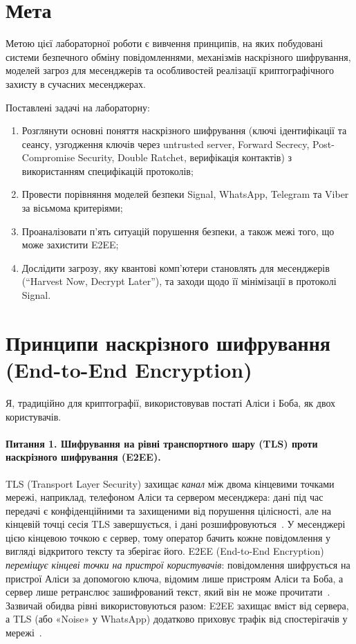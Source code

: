 \section{Мета}
\label{sec:objective}
Метою цієї лабораторної роботи є вивчення принципів, на яких побудовані системи безпечного обміну повідомленнями, 
механізмів наскрізного шифрування, моделей загроз для месенджерів та особливостей реалізації криптографічного 
захисту в сучасних месенджерах.

Поставлені задачі на лабораторну:
\begin{enumerate}[noitemsep]
    \item Розглянути основні поняття наскрізного шифрування (ключі ідентифікації та сеансу, узгодження ключів через 
        untrusted server, Forward Secrecy, Post-Compromise Security, Double Ratchet, верифікація контактів) з 
        використанням специфікацій протоколів;
    \item Провести порівняння моделей безпеки Signal, WhatsApp, Telegram та Viber за вісьмома критеріями;
    \item Проаналізовати п'ять ситуацій порушення безпеки, а також межі того, що може захистити E2EE;
    \item Дослідити загрозу, яку квантові комп’ютери становлять для месенджерів (\enquote{Harvest Now, Decrypt 
        Later}), та заходи щодо її мінімізації в протоколі Signal.
\end{enumerate}

\section{Принципи наскрізного шифрування (End-to-End Encryption)}
\label{sec:questions}
Я, традиційно для криптографії, використовував постаті Аліси і Боба, як двох користувачів.
\paragraph{Питання 1. Шифрування на рівні транспортного шару (TLS) проти наскрізного шифрування (E2EE).}
TLS (Transport Layer Security) захищає \emph{канал} між двома кінцевими точками мережі, наприклад, телефоном 
Аліси та сервером месенджера: дані під час передачі є конфіденційними та захищеними від порушення цілісності, 
але на кінцевій точці сесія TLS завершується, і дані розшифровуються~\cite{rfc9846}. У месенджері цією кінцевою 
точкою є сервер, тому оператор бачить кожне повідомлення у вигляді відкритого тексту та зберігає його. E2EE 
(End-to-End Encryption) \emph{переміщує кінцеві точки на пристрої користувачів}: повідомлення шифрується на 
пристрої Аліси за допомогою ключа, відомим лише пристроям Аліси та Боба, а сервер лише ретранслює зашифрований 
текст, який він не може прочитати~\cite{signal_x3dh}. Зазвичай обидва рівні використовуються разом: E2EE захищає 
вміст від сервера, а TLS (або «Noise» у WhatsApp) додатково приховує трафік від спостерігачів у мережі~\cite{whatsapp_whitepaper}. 

